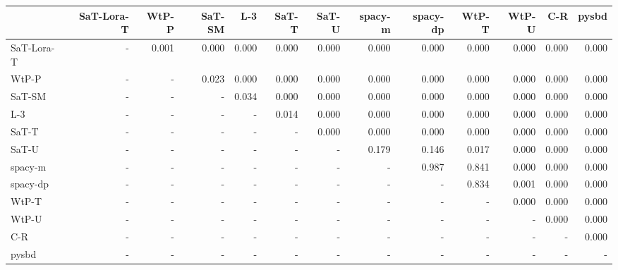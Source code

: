 \begin{tabular}{lrrrrrrrrrrrr}
\toprule
 & SaT-Lora-T & WtP-P & SaT-SM & L-3 & SaT-T & SaT-U & spacy-m & spacy-dp & WtP-T & WtP-U & C-R & pysbd \\
\midrule
SaT-Lora-T & - & 0.001 & 0.000 & 0.000 & 0.000 & 0.000 & 0.000 & 0.000 & 0.000 & 0.000 & 0.000 & 0.000 \\
WtP-P & - & - & 0.023 & 0.000 & 0.000 & 0.000 & 0.000 & 0.000 & 0.000 & 0.000 & 0.000 & 0.000 \\
SaT-SM & - & - & - & 0.034 & 0.000 & 0.000 & 0.000 & 0.000 & 0.000 & 0.000 & 0.000 & 0.000 \\
L-3 & - & - & - & - & 0.014 & 0.000 & 0.000 & 0.000 & 0.000 & 0.000 & 0.000 & 0.000 \\
SaT-T & - & - & - & - & - & 0.000 & 0.000 & 0.000 & 0.000 & 0.000 & 0.000 & 0.000 \\
SaT-U & - & - & - & - & - & - & 0.179 & 0.146 & 0.017 & 0.000 & 0.000 & 0.000 \\
spacy-m & - & - & - & - & - & - & - & 0.987 & 0.841 & 0.000 & 0.000 & 0.000 \\
spacy-dp & - & - & - & - & - & - & - & - & 0.834 & 0.001 & 0.000 & 0.000 \\
WtP-T & - & - & - & - & - & - & - & - & - & 0.000 & 0.000 & 0.000 \\
WtP-U & - & - & - & - & - & - & - & - & - & - & 0.000 & 0.000 \\
C-R & - & - & - & - & - & - & - & - & - & - & - & 0.000 \\
pysbd & - & - & - & - & - & - & - & - & - & - & - & - \\
\bottomrule
\end{tabular}

